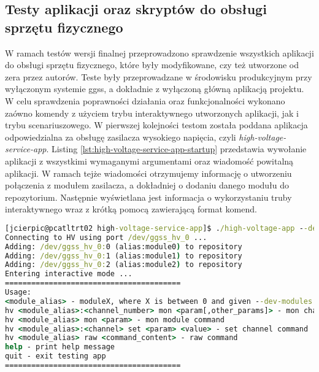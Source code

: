 
\subsection{Testy aplikacji oraz skryptów do obsługi sprzętu fizycznego}

W ramach testów wersji finalnej przeprowadzono sprawdzenie wszystkich aplikacji do obsługi sprzętu fizycznego, które były modyfikowane, czy też utworzone od zera przez autorów. Teste były przeprowadzane w środowisku produkcyjnym przy wyłączonym systemie ggss, a dokładnie z wyłączoną główną aplikacją projektu. W celu sprawdzenia poprawności działania oraz funkcjonalności wykonano zaówno komendy z użyciem trybu interaktywnego utworzonych aplikacji, jak i trybu scenariuszowego. W pierwszej kolejności testom została poddana aplikacja odpowiedzialna za obsługę zasilacza wysokiego napięcia, czyli \emph{high-voltage-service-app}. Listing \ref{lst:high-voltage-service-app-startup} przedstawia wywołanie aplikacji z wszystkimi wymaganymi argumentami oraz wiadomość powitalną aplikacji. W ramach tejże wiadomości otrzymujemy informację o utworzeniu połączenia z modułem zasilacza, a dokładniej o dodaniu danego modułu do repozytorium. Następnie wyświetlana jest informacja o wykorzystaniu truby interaktywnego wraz z krótką pomocą zawierającą format komend.

\begin{lstlisting}[language=cmd,caption={Uruchomienie aplikacji \emph{high-voltage-service-app} w trybie interaktywnym},label={lst:high-voltage-service-app-startup},frame=single]
[jcierpic@pcatltrt02 high-voltage-service-app]$ ./high-voltage-app --dev-port=/dev/ggss_hv_0 --dev-modules 3
Connecting to HV using port /dev/ggss_hv_0 ...
Adding: /dev/ggss_hv_0:0 (alias:module0) to repository
Adding: /dev/ggss_hv_0:1 (alias:module1) to repository
Adding: /dev/ggss_hv_0:2 (alias:module2) to repository
Entering interactive mode ...
========================================
Usage:
<module_alias> - moduleX, where X is between 0 and given --dev-modules exclusive
hv <module_alias>:<channel_number> mon <param[,other_params]> - mon channel command
hv <module_alias> mon <param> - mon module command
hv <module_alias>:<channel> set <param> <value> - set channel command
hv <module_alias> raw <command_content> - raw command
help - print help message
quit - exit testing app
========================================
\end{lstlisting}

